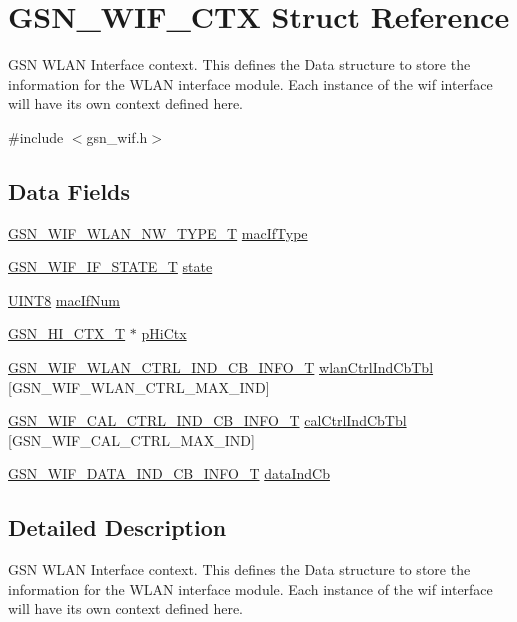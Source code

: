 \hypertarget{a00323}{
\section{GSN\_\-WIF\_\-CTX Struct Reference}
\label{a00323}
}


GSN WLAN Interface context. This defines the Data structure to store the information for the WLAN interface module. Each instance of the wif interface will have its own context defined here.  




{\ttfamily \#include $<$gsn\_\-wif.h$>$}

\subsection*{Data Fields}
\begin{DoxyCompactItemize}
\item 
\hyperlink{a00677_gabc852e0cb262314c5f307a3e9802921e}{GSN\_\-WIF\_\-WLAN\_\-NW\_\-TYPE\_\-T} \hyperlink{a00323_a3ee37b79013f1da93271b12024198eed}{macIfType}
\item 
\hyperlink{a00639_ga7ff7134a0bdba9e91d4edf9cea797de7}{GSN\_\-WIF\_\-IF\_\-STATE\_\-T} \hyperlink{a00323_a3f6086ca990f81e2275fbe02baf56620}{state}
\item 
\hyperlink{a00660_gab27e9918b538ce9d8ca692479b375b6a}{UINT8} \hyperlink{a00323_ae57ae92e651751e7978e237c55133b4c}{macIfNum}
\item 
\hyperlink{a00085}{GSN\_\-HI\_\-CTX\_\-T} $\ast$ \hyperlink{a00323_ab671e23204d79f8fda7dba9992c3d6e9}{pHiCtx}
\item 
\hyperlink{a00378}{GSN\_\-WIF\_\-WLAN\_\-CTRL\_\-IND\_\-CB\_\-INFO\_\-T} \hyperlink{a00323_acda926f459f060896e5bc461acf633fb}{wlanCtrlIndCbTbl} \mbox{[}GSN\_\-WIF\_\-WLAN\_\-CTRL\_\-MAX\_\-IND\mbox{]}
\item 
\hyperlink{a00318}{GSN\_\-WIF\_\-CAL\_\-CTRL\_\-IND\_\-CB\_\-INFO\_\-T} \hyperlink{a00323_a4964ff7aaa3b18e3676bf5d6781b710a}{calCtrlIndCbTbl} \mbox{[}GSN\_\-WIF\_\-CAL\_\-CTRL\_\-MAX\_\-IND\mbox{]}
\item 
\hyperlink{a00324}{GSN\_\-WIF\_\-DATA\_\-IND\_\-CB\_\-INFO\_\-T} \hyperlink{a00323_a0a90ad3e7a8afda41c61fef59c158b79}{dataIndCb}
\end{DoxyCompactItemize}


\subsection{Detailed Description}
GSN WLAN Interface context. This defines the Data structure to store the information for the WLAN interface module. Each instance of the wif interface will have its own context defined here. 

